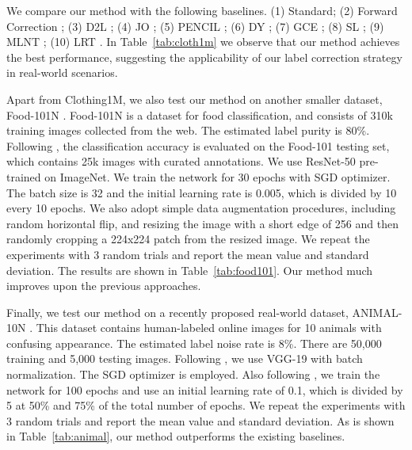 \documentclass{article} \usepackage{iclr2021_conference,times}
\begin{document}
We compare our method with the following baselines. (1) Standard; (2) Forward Correction \citep{patrini_CVPR2017_FCorrection}; (3) D2L \citep{Ma_dim_driven_ICML18}; (4) JO \citep{tanaka2018joint}; (5) PENCIL \citep{pencil_cvpr2019}; (6) DY \citep{dynamic_bootstrap_2019_icml}; (7) GCE \citep{gce_nips2018}; (8) SL \citep{sce_cvpr2019}; (9) MLNT \citep{learning_to_learn_cvpr2019}; (10) LRT \citep{songzhu_2020_ICML}. In Table~\ref{tab:cloth1m} we observe that our method achieves the best performance, suggesting the applicability of our label correction strategy in real-world scenarios.

Apart from Clothing1M, we also test our method on another smaller dataset, Food-101N \citep{food101n}. Food-101N is a dataset for food classification, and consists of 310k training images collected from the web. The estimated label purity is 80\%. Following \citep{food101n}, the classification accuracy is evaluated on the Food-101 \citep{food101} testing set, which contains 25k images with curated annotations. We use ResNet-50 pre-trained on ImageNet. We train the network for 30 epochs with SGD optimizer. The batch size is 32 and the initial learning rate is 0.005, which is divided by 10 every 10 epochs. We also adopt simple data augmentation procedures, including random horizontal flip, and resizing the image with a short edge of 256 and then randomly cropping a 224x224 patch from the resized image. We repeat the experiments with 3 random trials and report the mean value and standard deviation. The results are shown in Table~\ref{tab:food101}. Our method much improves upon the previous approaches.

Finally, we test our method on a recently proposed real-world dataset, ANIMAL-10N \citep{song2019selfie}. This dataset contains human-labeled online images for 10 animals with confusing appearance. The estimated label noise rate is 8\%. There are 50,000 training and 5,000 testing images. Following \citep{song2019selfie}, we use VGG-19 with batch normalization. The SGD optimizer is employed. Also following \citep{song2019selfie}, we train the network for 100 epochs and use an initial learning rate of 0.1, which is divided by 5 at 50\% and 75\% of the total number of epochs. We repeat the experiments with 3 random trials and report the mean value and standard deviation. As is shown in Table~\ref{tab:animal}, our method outperforms the existing baselines.
\end{document}
